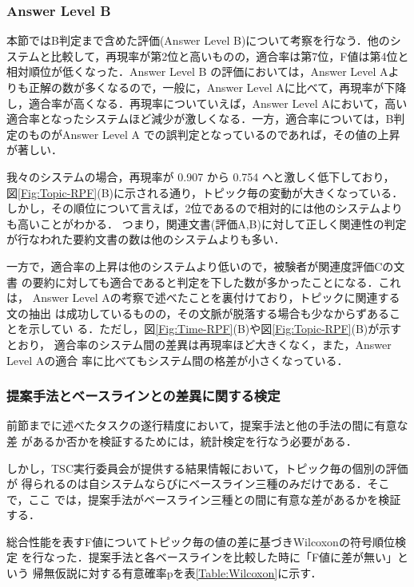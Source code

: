 \subsubsection{Answer Level B}
\label{Sec:Answer Level B}

本節ではB判定まで含めた評価(Answer Level B)について考察を行なう．他のシ
ステムと比較して，再現率が第2位と高いものの，適合率は第7位，F値は第4位と
相対順位が低くなった．Answer Level B の評価においては，Answer Level Aよ
りも正解の数が多くなるので，一般に，Answer Level Aに比べて，再現率が下降
し，適合率が高くなる．再現率についていえば，Answer Level Aにおいて，高い
適合率となったシステムほど減少が激しくなる．一方，適合率については，B判
定のものがAnswer Level A での誤判定となっているのであれば，その値の上昇
が著しい．

我々のシステムの場合，再現率が 0.907 から 0.754 へと激しく低下しており，
図\ref{Fig:Topic-RPF}(B)に示される通り，トピック毎の変動が大きくなっている．
しかし，その順位について言えば，2位であるので相対的には他のシステムよりも高いことがわかる．
つまり，関連文書(評価A,B)に対して正しく関連性の判定が行なわれた要約文書の数は他のシステムよりも多い．

一方で，適合率の上昇は他のシステムより低いので，被験者が関連度評価Cの文書
の要約に対しても適合であると判定を下した数が多かったことになる．これは，
Answer Level Aの考察で述べたことを裏付けており，トピックに関連する文の抽出
は成功しているものの，その文脈が脱落する場合も少なからずあることを示してい
る．ただし，図\ref{Fig:Time-RPF}(B)や図\ref{Fig:Topic-RPF}(B)が示すとおり，
適合率のシステム間の差異は再現率ほど大きくなく，また，Answer Level Aの適合
率に比べてもシステム間の格差が小さくなっている．

\subsubsection{提案手法とベースラインとの差異に関する検定}

前節までに述べたタスクの遂行精度において，提案手法と他の手法の間に有意な差
があるか否かを検証するためには，統計検定を行なう必要がある．

しかし，TSC実行委員会が提供する結果情報において，トピック毎の個別の評価が
得られるのは自システムならびにベースライン三種のみだけである．そこで，ここ
では，提案手法がベースライン三種との間に有意な差があるかを検証する．

総合性能を表すF値についてトピック毎の値の差に基づきWilcoxonの符号順位検定
を行なった．提案手法と各ベースラインを比較した時に「F値に差が無い」という
帰無仮説に対する有意確率pを表\ref{Table:Wilcoxon}に示す．

